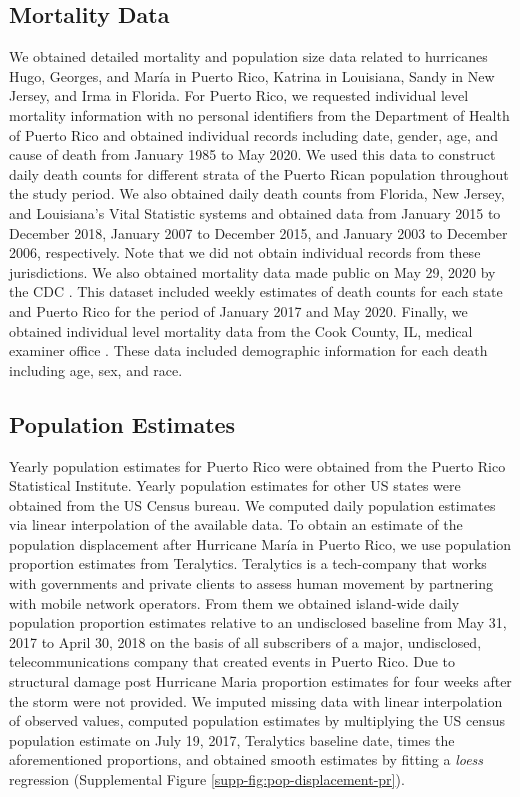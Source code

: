 \documentclass[11pt]{article}
\begin{document}
\subsection{Mortality Data}
\label{subsec:mortality-data}
We obtained detailed mortality and population size data related to hurricanes Hugo, Georges, and Mar\'ia in Puerto Rico, Katrina in Louisiana, Sandy in New Jersey, and Irma in Florida. For Puerto Rico, we requested individual level mortality information with no personal identifiers from the Department of Health of Puerto Rico and obtained individual records including date, gender, age, and cause of death from January 1985 to May 2020. We used this data to construct daily death counts for different strata of the Puerto Rican population throughout the study period. We also obtained daily death counts from Florida, New Jersey, and Louisiana’s Vital Statistic systems and obtained data from January 2015 to December 2018, January 2007 to December 2015, and January 2003 to December 2006, respectively. Note that we did not obtain individual records from these jurisdictions. We also obtained mortality data made public on May 29, 2020 by the CDC  \cite{cdc2020covid19}. This dataset included weekly estimates of death counts for each state and Puerto Rico for the period of January 2017 and May 2020. 
Finally, we obtained individual level mortality data from the Cook County, IL, medical examiner office \cite{cookcovid19}. These data included demographic information for each death including age, sex, and race.

\subsection{Population Estimates}
\label{subsec:population}
Yearly population estimates for Puerto Rico were obtained from the Puerto Rico Statistical Institute. Yearly population estimates for other US states were obtained from the US Census bureau. We computed daily population estimates via linear interpolation of the available data. To obtain an estimate of the population displacement after Hurricane Mar\'ia in Puerto Rico, we use population proportion estimates from Teralytics. Teralytics is a tech-company that works with governments and private clients to assess human movement by partnering with mobile network operators. From them we obtained island-wide daily population proportion estimates relative to an undisclosed baseline from May 31, 2017 to April 30, 2018 on the basis of all subscribers of a major, undisclosed, telecommunications company that created events in Puerto Rico. Due to structural damage post Hurricane Maria proportion estimates for four weeks after the storm were not provided. We imputed missing data with linear interpolation of observed values, computed population estimates by multiplying the US census population estimate on July 19, 2017, Teralytics baseline date, times the aforementioned proportions, and obtained smooth estimates by fitting a \textit{loess} regression (Supplemental Figure \ref{supp-fig:pop-displacement-pr}).
\end{document}
